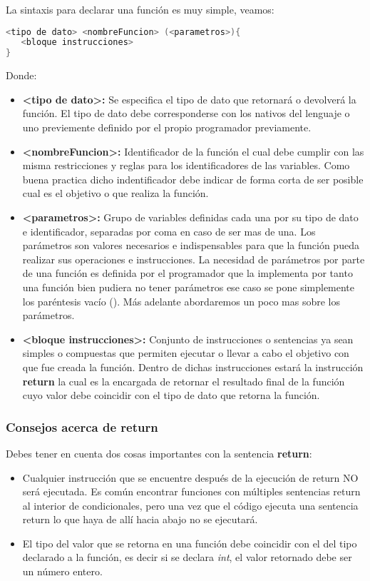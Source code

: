 La sintaxis para declarar una función es muy simple, veamos:

\begin{lstlisting}[language=C++]
<tipo de dato> <nombreFuncion> (<parametros>){
   <bloque instrucciones>
}
\end{lstlisting}

Donde:

\begin{itemize}
	\item \textbf{<tipo de dato>:} Se especifica el tipo de dato que retornará o devolverá la función. El tipo de dato debe corresponderse con los nativos del lenguaje o uno previemente definido por el propio programador previamente. 
	\item \textbf{<nombreFuncion>:} Identificador de la función el cual debe cumplir con las misma restricciones y reglas para los identificadores de las variables. Como buena practica dicho indentificador debe indicar de forma corta de ser posible cual es el objetivo o que realiza la función.
	\item \textbf{<parametros>:} Grupo de variables definidas cada una por su tipo de dato e identificador, separadas por coma en caso de ser mas de una. Los parámetros son valores necesarios e indispensables para que la función pueda realizar sus operaciones e instrucciones. La necesidad de parámetros por parte de una función es definida por el programador que la implementa por tanto una función bien pudiera no tener parámetros ese caso se pone simplemente los paréntesis vacío (). Más adelante abordaremos un poco mas sobre los parámetros.  
	\item \textbf{<bloque instrucciones>:} Conjunto de instrucciones o sentencias ya sean simples o compuestas que permiten ejecutar o llevar a cabo el objetivo con que fue creada la función. Dentro de dichas instrucciones estará la instrucción \textbf{return} la cual es la encargada de retornar el resultado final de la función cuyo valor debe coincidir con el tipo de dato que retorna la función.
\end{itemize}

\subsubsection{Consejos acerca de return}

Debes tener en cuenta dos cosas importantes con la sentencia \textbf{return}:

\begin{itemize}
	\item Cualquier instrucción que se encuentre después de la ejecución de return NO será ejecutada. Es común encontrar funciones con múltiples sentencias return al interior de condicionales, pero una vez que el código ejecuta una sentencia return lo que haya de allí hacia abajo no se ejecutará. 
	\item El tipo del valor que se retorna en una función debe coincidir con el del tipo declarado a la función, es decir si se declara \emph{int}, el valor retornado debe ser un número entero.
\end{itemize}

